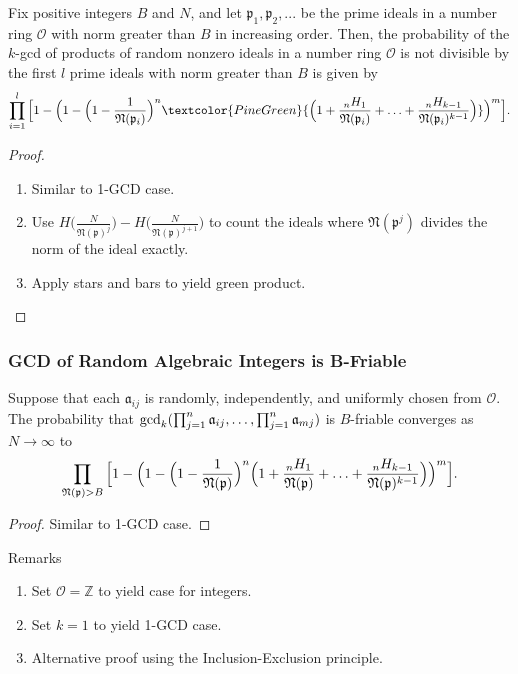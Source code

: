 \documentclass[11pt,xcolor={dvipsnames}]{beamer}
\newcommand{\f}[1]{\mathfrak{#1}}
\begin{document}
\begin{frame}
	\begin{theorem}
		Fix positive integers $B$ and $N$, and let $\f{p}_1, \f{p}_2, ...$ be the prime ideals in a number ring $\mathcal{O}$ with norm greater than $B$ in increasing order. Then, the probability of the $k$-gcd of products of random nonzero ideals in a number ring $\mathcal{O}$ is not divisible by the first $l$ prime ideals with norm greater than $B$ is given by 
		$$\prod_{i=1}^{l} \Big[1 - \Big(1 - \Big(1-\frac{1}{\mathfrak{N}(\f{p}_i)}\Big)^n \textcolor{PineGreen}{\Big(1+\frac{{}_nH_1}{\f{N}(\f{p}_i)}+\mathellipsis+\frac{{}_nH_{k-1}}{\f{N}(\f{p}_i)^{k-1}}\Big)}\Big)^m\Big].$$
	\end{theorem}
	
	\begin{proof}
		\begin{enumerate}
			\item Similar to 1-GCD case.
			\item Use $H\bigg(\frac{N}{\f{N}(\f{p})^j}\bigg) - H\bigg(\frac{N}{\f{N}(\f{p})^{j+1}}\bigg)$ to count the ideals where $\f{N}(\f{p}^j)$ divides the norm of the ideal exactly.
			\item Apply stars and bars to yield \textcolor{PineGreen}{green product.}
		\end{enumerate}
	\end{proof}
\end{frame}

\begin{frame}
	\begin{theorem}
		\frametitle{GCD of Random Algebraic Integers is B-Friable}
		Suppose that each $\f{a}_{ij}$ is randomly, independently, and uniformly chosen from $\mathcal{O}$. The probability that $\gcd_k(\prod_{j=1}^{n}\f{a}_{ij},\mathellipsis,\prod_{j=1}^{n}\f{a}_{mj})$ is $B$-friable converges as $N\to\infty$ to $$\prod_{\f{N}(\f{p})>B} \Big[1 - \Big(1 -\Big(1-\frac{1}{\f{N}(\f{p})}\Big)^n\Big(1+\frac{{}_nH_1}{\f{N}(\f{p})}+\mathellipsis+\frac{{}_nH_{k-1}}{\f{N}(\f{p})^{k-1}}\Big)\Big)^m\Big].$$
	\end{theorem}
	
	\begin{proof}
		Similar to 1-GCD case. 
	\end{proof}
	
	\begin{alertblock}{Remarks}
		\begin{enumerate}
			\item Set $\mathcal{O}=\mathbb{Z}$ to yield case for integers.
			\item Set $k=1$ to yield 1-GCD case.
			\item Alternative proof using the Inclusion-Exclusion principle.
		\end{enumerate}
	\end{alertblock}
\end{frame}
\end{document}
